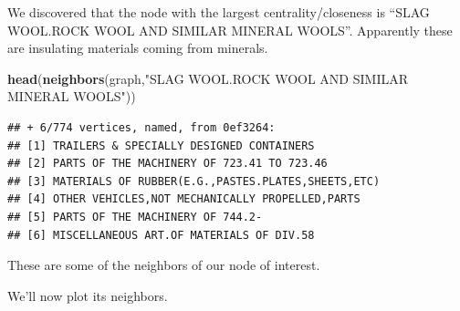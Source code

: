 \documentclass[
]{article}
\newenvironment{Shaded}{\begin{snugshade}}{\end{snugshade}}
\newcommand{\FunctionTok}[1]{\textcolor[rgb]{0.13,0.29,0.53}{\textbf{#1}}}
\newcommand{\NormalTok}[1]{#1}
\newcommand{\StringTok}[1]{\textcolor[rgb]{0.31,0.60,0.02}{#1}}
\begin{document}
We discovered that the node with the largest centrality/closeness is
``SLAG WOOL.ROCK WOOL AND SIMILAR MINERAL WOOLS''. Apparently these are
insulating materials coming from minerals.

\begin{Shaded}
\begin{Highlighting}[]
\FunctionTok{head}\NormalTok{(}\FunctionTok{neighbors}\NormalTok{(graph,}\StringTok{"SLAG WOOL.ROCK WOOL AND SIMILAR MINERAL WOOLS"}\NormalTok{))}
\end{Highlighting}
\end{Shaded}

\begin{verbatim}
## + 6/774 vertices, named, from 0ef3264:
## [1] TRAILERS & SPECIALLY DESIGNED CONTAINERS          
## [2] PARTS OF THE MACHINERY OF 723.41 TO 723.46        
## [3] MATERIALS OF RUBBER(E.G.,PASTES.PLATES,SHEETS,ETC)
## [4] OTHER VEHICLES,NOT MECHANICALLY PROPELLED,PARTS   
## [5] PARTS OF THE MACHINERY OF 744.2-                  
## [6] MISCELLANEOUS ART.OF MATERIALS OF DIV.58
\end{verbatim}

These are some of the neighbors of our node of interest.

We'll now plot its neighbors.
\end{document}
